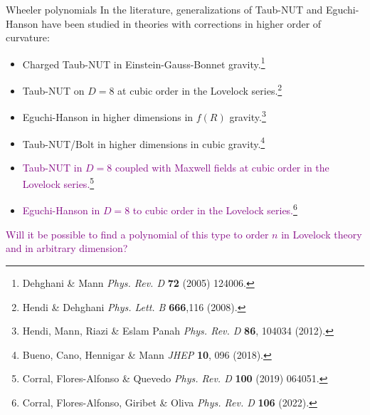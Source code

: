 \documentclass[aspectratio=169,xcolor=dvipsnames]{beamer}
\begin{document}
\begin{frame}{Wheeler polynomials}\justifying
    In the literature, generalizations of Taub-NUT and Eguchi-Hanson have been studied in theories with corrections in higher order of curvature:   \begin{itemize}
    \item Charged Taub-NUT in Einstein-Gauss-Bonnet gravity.\footnote{Dehghani \& Mann \textit{Phys. Rev. D} \textbf{72} (2005) 124006.}
    \item Taub-NUT on $D=8$ at cubic order in the Lovelock series.\footnote{Hendi \& Dehghani \textit{Phys. Lett. B} \textbf{666},116 (2008).}
        \item Eguchi-Hanson in higher dimensions in $f(R)$ gravity.\footnote{Hendi, Mann, Riazi \& Eslam Panah \textit{Phys. Rev. D} \textbf{86}, 104034 (2012).}
        \item Taub-NUT/Bolt in higher dimensions in cubic gravity.\footnote{Bueno, Cano, Hennigar \& Mann \textit{JHEP} \textbf{10}, 096 (2018).}
        \item \textcolor{purple}{Taub-NUT in $D=8$ coupled with Maxwell fields at cubic order in the Lovelock series.}\footnote{Corral, Flores-Alfonso \& Quevedo \textit{Phys. Rev. D} \textbf{100} (2019) 064051.}
        \item \textcolor{purple}{Eguchi-Hanson in $D=8$ to cubic order in the Lovelock series.}\footnote{Corral, Flores-Alfonso, Giribet \& Oliva \textit{Phys. Rev. D} \textbf{106} (2022).}
    \end{itemize}
\end{frame}

\begin{frame}\justifying
\begin{center}
    \textcolor{purple}{Will it be possible to find a polynomial of this type to order $n$ in Lovelock theory and in arbitrary dimension?}
\end{center}
\end{frame}


\end{document}
